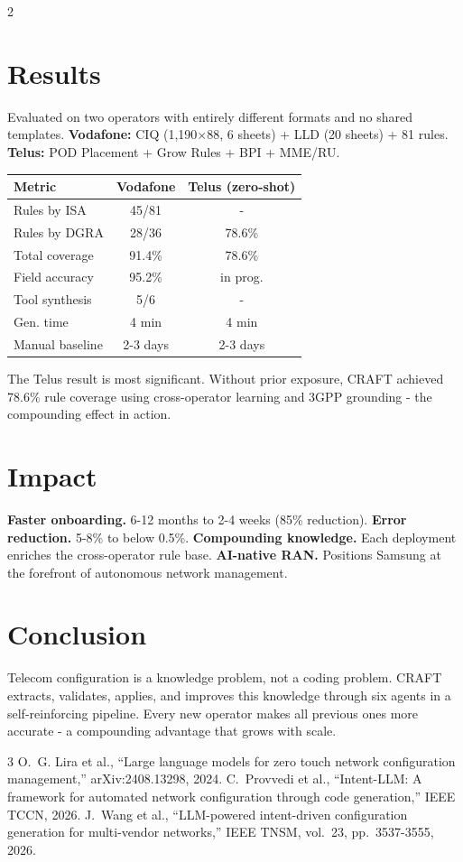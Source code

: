 \documentclass[10pt]{article}
\begin{document}
\begin{multicols}{2}
\section{Results}
Evaluated on two operators with entirely different formats and no shared templates.
\textbf{Vodafone:} CIQ (1,190$\times$88, 6 sheets) + LLD (20 sheets) + 81 rules. \textbf{Telus:} POD Placement + Grow Rules + BPI + MME/RU.
\begin{center}
\renewcommand{\arraystretch}{1.2}
\small
\begin{tabular}{lcc}
\toprule
\textbf{Metric} & \textbf{Vodafone} & \textbf{Telus (zero-shot)} \\
\midrule
Rules by ISA & 45/81 & - \\
Rules by DGRA & 28/36 & 78.6\% \\
Total coverage & 91.4\% & 78.6\% \\
Field accuracy & 95.2\% & in prog. \\
Tool synthesis & 5/6 & - \\
Gen. time & 4 min & 4 min \\
Manual baseline & 2-3 days & 2-3 days \\
\bottomrule
\end{tabular}
\end{center}
The Telus result is most significant. Without prior exposure, CRAFT achieved 78.6\% rule coverage using cross-operator learning and 3GPP grounding - the compounding effect in action.
\section{Impact}
\textbf{Faster onboarding.} 6-12 months to 2-4 weeks (85\% reduction). \textbf{Error reduction.} 5-8\% to below 0.5\%. \textbf{Compounding knowledge.} Each deployment enriches the cross-operator rule base. \textbf{AI-native RAN.} Positions Samsung at the forefront of autonomous network management.
\section{Conclusion}
Telecom configuration is a knowledge problem, not a coding problem. CRAFT extracts, validates, applies, and improves this knowledge through six agents in a self-reinforcing pipeline. Every new operator makes all previous ones more accurate - a compounding advantage that grows with scale.
\end{multicols}
\begin{thebibliography}{3}
\small
{} O.~G. Lira et al., ``Large language models for zero touch network configuration management,'' arXiv:2408.13298, 2024.
 C.~Provvedi et al., ``Intent-LLM: A framework for automated network configuration through code generation,'' IEEE TCCN, 2026.
 J.~Wang et al., ``LLM-powered intent-driven configuration generation for multi-vendor networks,'' IEEE TNSM, vol.~23, pp.~3537-3555, 2026.
\end{thebibliography}
\end{document}
